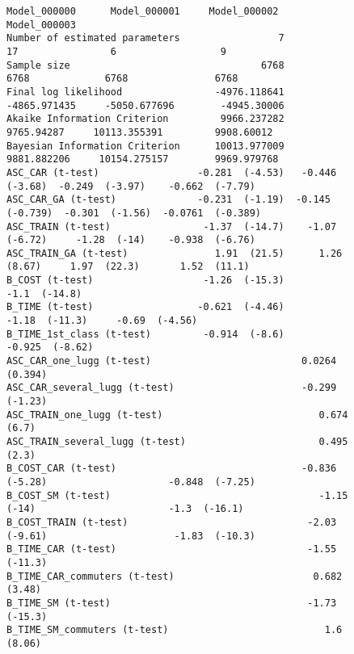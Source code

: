 \documentclass[12pt,a4paper]{article}
\begin{document}
\begin{landscape}
  \begin{figure}[p]
    \begin{lstlisting}[basicstyle=\scriptsize]
                                    Model_000000      Model_000001     Model_000002       Model_000003
Number of estimated parameters                 7                17                6                  9
Sample size                                 6768              6768             6768               6768
Final log likelihood                -4976.118641      -4865.971435     -5050.677696        -4945.30006
Akaike Information Criterion         9966.237282        9765.94287     10113.355391         9908.60012
Bayesian Information Criterion      10013.977009       9881.882206     10154.275157        9969.979768
ASC_CAR (t-test)                 -0.281  (-4.53)   -0.446  (-3.68)  -0.249  (-3.97)    -0.662  (-7.79)
ASC_CAR_GA (t-test)              -0.231  (-1.19)  -0.145  (-0.739)  -0.301  (-1.56)  -0.0761  (-0.389)
ASC_TRAIN (t-test)                -1.37  (-14.7)    -1.07  (-6.72)     -1.28  (-14)    -0.938  (-6.76)
ASC_TRAIN_GA (t-test)               1.91  (21.5)      1.26  (8.67)     1.97  (22.3)       1.52  (11.1)
B_COST (t-test)                   -1.26  (-15.3)                      -1.1  (-14.8)                   
B_TIME (t-test)                  -0.621  (-4.46)                     -1.18  (-11.3)     -0.69  (-4.56)
B_TIME_1st_class (t-test)         -0.914  (-8.6)                                       -0.925  (-8.62)
ASC_CAR_one_lugg (t-test)                          0.0264  (0.394)
ASC_CAR_several_lugg (t-test)                      -0.299  (-1.23)
ASC_TRAIN_one_lugg (t-test)                           0.674  (6.7)
ASC_TRAIN_several_lugg (t-test)                       0.495  (2.3)
B_COST_CAR (t-test)                                -0.836  (-5.28)                     -0.848  (-7.25)
B_COST_SM (t-test)                                    -1.15  (-14)                       -1.3  (-16.1)
B_COST_TRAIN (t-test)                               -2.03  (-9.61)                      -1.83  (-10.3)
B_TIME_CAR (t-test)                                 -1.55  (-11.3)                                    
B_TIME_CAR_commuters (t-test)                        0.682  (3.48)                                    
B_TIME_SM (t-test)                                  -1.73  (-15.3)                                    
B_TIME_SM_commuters (t-test)                           1.6  (8.06)                                    

\end{lstlisting}
\end{figure}
\end{landscape}
\end{document}

